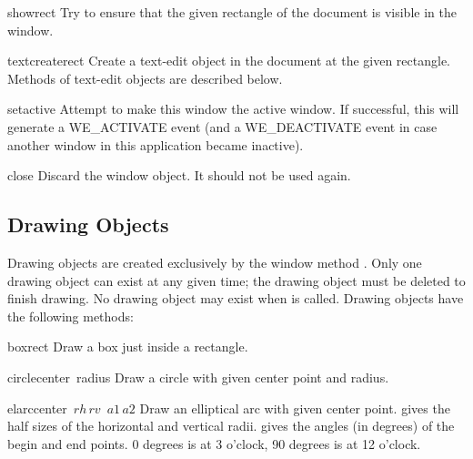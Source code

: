 \begin{funcdesc}{show}{rect}
Try to ensure that the given rectangle of the document is visible in
the window.
\end{funcdesc}

\begin{funcdesc}{textcreate}{rect}
Create a text-edit object in the document at the given rectangle.
Methods of text-edit objects are described below.
\end{funcdesc}

\begin{funcdesc}{setactive}{}
Attempt to make this window the active window.  If successful, this
will generate a WE_ACTIVATE event (and a WE_DEACTIVATE event in case
another window in this application became inactive).
\end{funcdesc}

\begin{funcdesc}{close}{}
Discard the window object.  It should not be used again.
\end{funcdesc}

\subsection{Drawing Objects}

Drawing objects are created exclusively by the window method
.
Only one drawing object can exist at any given time; the drawing object
must be deleted to finish drawing.
No drawing object may exist when
is called.
Drawing objects have the following methods:


\begin{funcdesc}{box}{rect}
Draw a box just inside a rectangle.
\end{funcdesc}

\begin{funcdesc}{circle}{center\, radius}
Draw a circle with given center point and radius.
\end{funcdesc}

\begin{funcdesc}{elarc}{center\, \(rh\, rv\)\, \(a1\, a2\)}
Draw an elliptical arc with given center point.
gives the half sizes of the horizontal and vertical radii.
gives the angles (in degrees) of the begin and end points.
0 degrees is at 3 o'clock, 90 degrees is at 12 o'clock.
\end{funcdesc}

